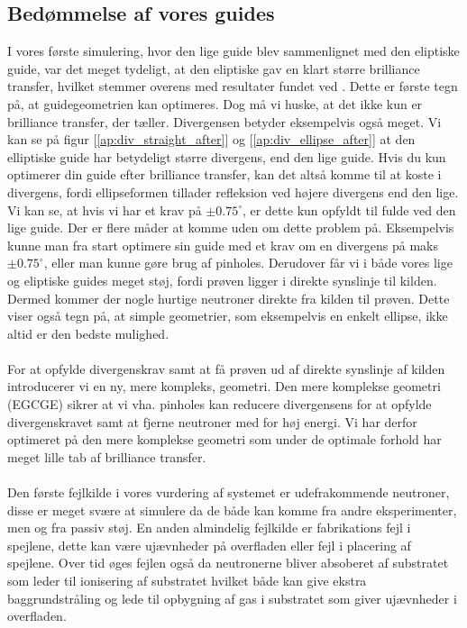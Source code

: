 \documentclass[12pt,oneside,a4paper]{article}
\begin{document}
{{{{{\subsection{Bedømmelse af vores guides}
I vores første simulering, hvor den lige guide blev sammenlignet med den eliptiske guide, var det meget tydeligt, at den eliptiske gav en klart større brilliance transfer, hvilket stemmer overens med resultater fundet ved \cite{Kleno201275}. Dette er første tegn på, at guidegeometrien kan optimeres. Dog må vi huske, at det ikke kun er brilliance transfer, der tæller. Divergensen betyder eksempelvis også meget. Vi kan se på figur [\ref{ap:div_straight_after}] og [\ref{ap:div_ellipse_after}] at den elliptiske guide har betydeligt større divergens, end den lige guide. Hvis du kun optimerer din guide efter brilliance transfer, kan det altså komme til at koste i divergens, fordi ellipseformen tillader refleksion ved højere divergens end den lige. Vi kan se, at hvis vi har et krav på $\pm 0.75^\circ$, er dette kun opfyldt til fulde ved den lige guide. Der er flere måder at komme uden om dette problem på. Eksempelvis kunne man fra start optimere sin guide med et krav om en divergens på maks  $\pm 0.75^\circ$, eller man kunne gøre brug af pinholes. Derudover får vi i både vores lige og eliptiske guides meget støj, fordi prøven ligger i direkte synslinje til kilden. Dermed kommer der nogle hurtige neutroner direkte fra kilden til prøven. Dette viser også tegn på, at simple geometrier, som eksempelvis en enkelt ellipse, ikke altid er den bedste mulighed.
\\
\\
For at opfylde divergenskrav samt at få prøven ud af direkte synslinje af kilden introducerer vi en ny, mere kompleks, geometri. Den mere komplekse geometri (EGCGE) sikrer at vi vha. pinholes kan reducere divergensens for at opfylde divergenskravet samt at fjerne neutroner med for høj energi. Vi har derfor optimeret på den mere komplekse geometri som under de optimale forhold har meget lille tab af brilliance transfer.
\\
\\
Den første fejlkilde i vores vurdering af systemet er udefrakommende neutroner, disse er meget svære at simulere da de både kan komme fra andre eksperimenter, men og fra passiv støj. En anden almindelig fejlkilde er fabrikations fejl i spejlene, dette kan være ujævnheder på overfladen eller fejl i placering af spejlene. Over tid øges fejlen også da neutronerne bliver absoberet af substratet som leder til ionisering af substratet hvilket både kan give ekstra baggrundstråling og lede til opbygning af gas i substratet som giver ujævnheder i overfladen.
}}}}}
\end{document}
